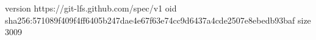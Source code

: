 version https://git-lfs.github.com/spec/v1
oid sha256:571089f409f4ff6405b247dae4e67f63e74cc9d6437a4cde2507e8ebedb93baf
size 3009
